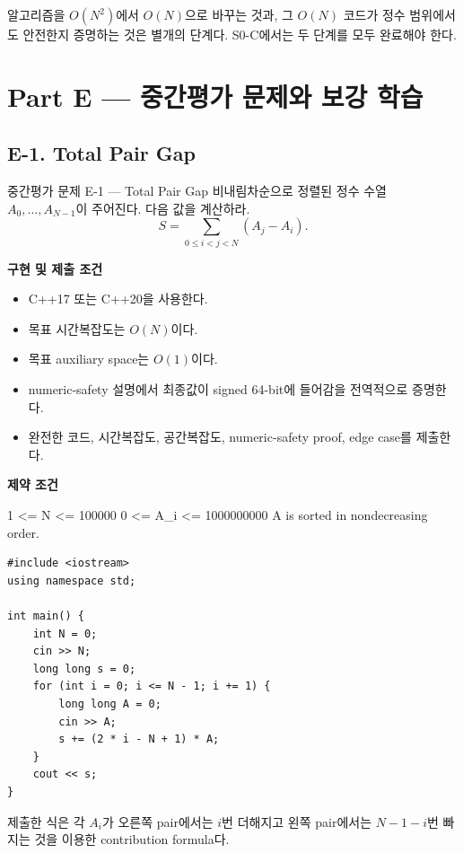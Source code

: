 \begin{keybox}
알고리즘을 $O(N^2)$에서 $O(N)$으로 바꾸는 것과, 그 $O(N)$ 코드가 정수 범위에서도 안전한지 증명하는 것은 별개의 단계다. S0-C에서는 두 단계를 모두 완료해야 한다.
\end{keybox}

\section{Part E --- 중간평가 문제와 보강 학습}

\subsection{E-1. Total Pair Gap}
\begin{problembox}{중간평가 문제 E-1 --- Total Pair Gap}
비내림차순으로 정렬된 정수 수열 $A_0,\dots,A_{N-1}$이 주어진다. 다음 값을 계산하라.
\[
S=\sum_{0\le i<j<N}(A_j-A_i).
\]

\textbf{구현 및 제출 조건}
\begin{itemize}
  \item C++17 또는 C++20을 사용한다.
  \item 목표 시간복잡도는 $O(N)$이다.
  \item 목표 auxiliary space는 $O(1)$이다.
  \item numeric-safety 설명에서 최종값이 signed 64-bit에 들어감을 전역적으로 증명한다.
  \item 완전한 코드, 시간복잡도, 공간복잡도, numeric-safety proof, edge case를 제출한다.
\end{itemize}

\textbf{제약 조건}
\begin{TextBlock}
1 <= N <= 100000
0 <= A_i <= 1000000000
A is sorted in nondecreasing order.
\end{TextBlock}
\end{problembox}

\begin{answerbox}[학습자 제출 답안]
\begin{lstlisting}
#include <iostream>
using namespace std;

int main() {
    int N = 0;
    cin >> N;
    long long s = 0;
    for (int i = 0; i <= N - 1; i += 1) {
        long long A = 0;
        cin >> A;
        s += (2 * i - N + 1) * A;
    }
    cout << s;
}
\end{lstlisting}

제출한 식은 각 $A_i$가 오른쪽 pair에서는 $i$번 더해지고 왼쪽 pair에서는 $N-1-i$번 빠지는 것을 이용한 contribution formula다.
\end{answerbox}

